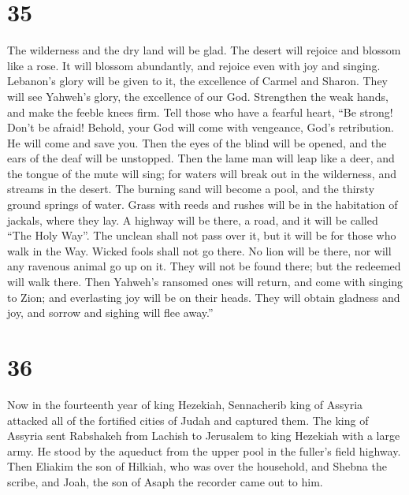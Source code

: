 \hypertarget{section-34}{%
\section{35}\label{section-34}}

 The wilderness and the dry land will be glad. The desert
will rejoice and blossom like a rose.  It will blossom
abundantly, and rejoice even with joy and singing. Lebanon's glory will
be given to it, the excellence of Carmel and Sharon. They will see
Yahweh's glory, the excellence of our God.  Strengthen the
weak hands, and make the feeble knees firm.  Tell those
who have a fearful heart, ``Be strong! Don't be afraid! Behold, your God
will come with vengeance, God's retribution. He will come and save you.
 Then the eyes of the blind will be opened, and the ears
of the deaf will be unstopped.  Then the lame man will
leap like a deer, and the tongue of the mute will sing; for waters will
break out in the wilderness, and streams in the desert. 
The burning sand will become a pool, and the thirsty ground springs of
water. Grass with reeds and rushes will be in the habitation of jackals,
where they lay.  A highway will be there, a road, and it
will be called ``The Holy Way''. The unclean shall not pass over it, but
it will be for those who walk in the Way. Wicked fools shall not go
there.  No lion will be there, nor will any ravenous
animal go up on it. They will not be found there; but the redeemed will
walk there.  Then Yahweh's ransomed ones will return, and
come with singing to Zion; and everlasting joy will be on their heads.
They will obtain gladness and joy, and sorrow and sighing will flee
away.''

\hypertarget{section-35}{%
\section{36}\label{section-35}}

 Now in the fourteenth year of king Hezekiah, Sennacherib
king of Assyria attacked all of the fortified cities of Judah and
captured them.  The king of Assyria sent Rabshakeh from
Lachish to Jerusalem to king Hezekiah with a large army. He stood by the
aqueduct from the upper pool in the fuller's field highway.
 Then Eliakim the son of Hilkiah, who was over the
household, and Shebna the scribe, and Joah, the son of Asaph the
recorder came out to him.

